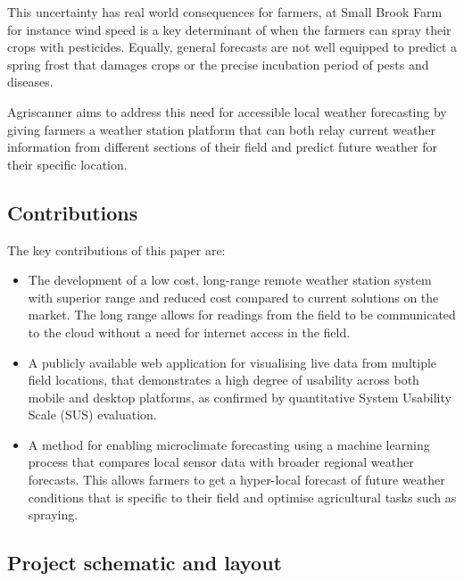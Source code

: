 This uncertainty has real world consequences for farmers, at Small Brook Farm
for instance wind speed is a key determinant of when the farmers can spray their
crops with pesticides. Equally, general forecasts are not well equipped to
predict a spring frost that damages crops or the precise incubation period of
pests and diseases.

Agriscanner aims to address this need for accessible local weather forecasting
by giving farmers a weather station platform that can both relay current weather
information from different sections of their field and predict future weather
for their specific location. 

\subsection{Contributions}

The key contributions of this paper are:

\begin{itemize}
    \item The development of a low cost, long-range remote weather station
    system with superior range and reduced cost compared to current solutions on
    the market. The long range allows for readings from the field to be
    communicated to the cloud without a need for internet access in the field.
    \item A publicly available web application for visualising live data from
    multiple field locations, that demonstrates a high degree of usability
    across both mobile and desktop platforms, as confirmed by quantitative
    System Usability Scale (SUS) evaluation.
    \item A method for enabling microclimate forecasting using a machine
    learning process that compares local sensor data with broader regional
    weather forecasts. This allows farmers to get a hyper-local forecast of
    future weather conditions that is specific to their field and optimise
    agricultural tasks such as spraying.
\end{itemize}

\subsection{Project schematic and layout}

